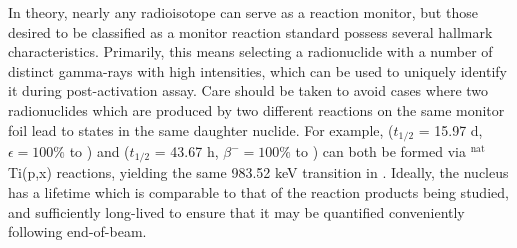 \documentclass[%
 reprint,
superscriptaddress,
onecolumn,
linenumbers,
notitlepage,
 amsmath,amssymb,
 aps,
prc,
]{revtex4-1}
\newcommand{\comment}[1]{\todo[color=blue!20!white,inline]{ASV: #1}}
\begin{document}
In theory, nearly any radioisotope can serve as a reaction monitor, but those desired to be classified as a monitor reaction standard possess several hallmark characteristics.
Primarily, this means selecting a radionuclide with a number of distinct gamma-rays with high intensities,  which can be used to uniquely identify it during post-activation assay.  
Care should be taken to avoid cases where two radionuclides which are produced by two different reactions on the same monitor foil lead to states in the same daughter nuclide.  
For example,   ($t_{1/2}$ = 15.97 d, $\epsilon=100\%$ to ) and   ($t_{1/2}$ = 43.67 h, $\beta^-=100\%$ to ) can both be formed via $^\text{nat}$Ti(p,x) reactions, yielding the same 983.52 keV transition in  \cite{Burrows2006}.
Ideally, the nucleus has a lifetime which is comparable to that of the reaction products being studied, and sufficiently long-lived to ensure that it may be quantified  conveniently 
following end-of-beam.
\end{document}
